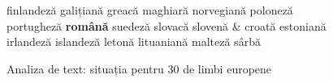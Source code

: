 \begin{figure}[tb]
\begin{tabular}
finlandeză \newline 
galițiană \newline 
greacă \newline 
maghiară \newline 
norvegiană \newline 
poloneză \newline 
portugheză \newline 
\textbf{română} \newline 
suedeză \newline 
slovacă \newline 
slovenă \newline 
& \vspace*{0.5mm} croată \newline 
estoniană \newline 
irlandeză \newline 
islandeză \newline 
letonă \newline 
lituaniană \newline 
malteză \newline 
sârbă \\
\end{tabular}
\caption{Analiza de text: situația pentru 30 de limbi europene}
\label{fig:text_cluster_de}
\end{figure}

